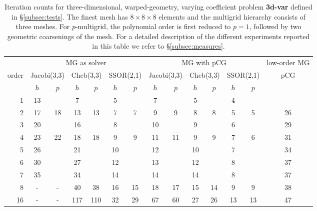 \documentclass[times]{nlaauth}
\begin{document}
\begin{table}
  \caption{\label{tab:3d-fan} Iteration counts for three-dimensional,
    warped-geometry, varying coefficient problem {\bf 3d-var} defined
    in \S\ref{subsec:tests}.     The finest
    mesh has $8\times 8\times 8$ elements and the multigrid hierarchy
    consists of three meshes.  For $p$-multigrid, the
    polynomial order is first reduced to $p=1$, followed by two
    geometric coarsenings of the mesh.
    For a detailed description of the
    different experiments reported in this table we refer to
    \S\ref{subsec:measures}.}  \centering
	  \begin{tabular}{|r|c c|c c|c c||c c|c c|c c||c|} 
	    \hline
	    & \multicolumn{6}{c||}{MG as solver} &
            \multicolumn{6}{c||}{MG with pCG} &
            \!\!low-order MG\!\! \\
	    \cline{2-13}
	    \!\!\! order \!\!\!\! &  \multicolumn{2}{c|}{\!\!\scriptsize  Jacobi(3,3)\!\!} &  \multicolumn{2}{c|}{\!\!\scriptsize Cheb(3,3)\!\!} & \multicolumn{2}{c||}{\!\!\scriptsize  SSOR(2,1)\!\!} & \multicolumn{2}{c|}{\!\!\scriptsize Jacobi(3,3)\!\!} &  \multicolumn{2}{c|}{\!\!\scriptsize Cheb(3,3)\!\!} & \multicolumn{2}{c||}{\!\!\scriptsize SSOR(2,1)\!\!} & pCG \\
	\hline
	 & $h$ & $p$ & $h$ & $p$& $h$ & $p$& $h$ & $p$& $h$ & $p$& $h$ & $p$& ~ \\
	 \cline{2-13}
1 & 13 & & 7 & & 5 & & 7 & & 5 & & 4 & & -  \\
2 & 17 & 18 & 13 & 13 & 7 & 7 & 9 & 9 & 8 & 8 & 5 & 5 & 26 \\
3 & 20 & & 16 & & 8 & & 10 & & 9 & & 6 & & 29  \\
4 & 23 & 22 & 18 & 18 & 9 & 9 & 11 & 11 & 9 & 9 & 7 & 6 & 31 \\
5 & 26 & & 21 & & 10 & & 12 & & 10 & & 7 & & 34  \\
6 & 30 & & 27 & & 12 & & 13 & & 12 & & 8 & & 37 \\
7 & 35 & & 34 & & 14 & & 14 & & 14 & & 8 & & 37  \\
8 & - & - & 40 & 38 & 16 & 15 & 18 & 17 & 15 & 14 & 9 & 9 & 38 \\
16 & - & - & 117 & 110 & 32 & 29 & 67 & 60 & 27 & 26 & 13 & 13 & 47\\
\hline
  \end{tabular}
\end{table}
\end{document}
